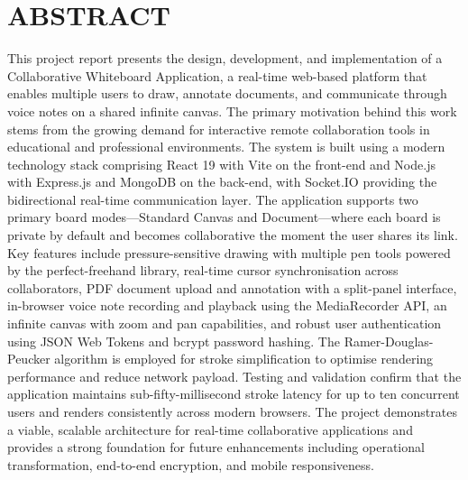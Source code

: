 \documentclass[12pt,a4paper]{report}
\begin{document}






\chapter*{ABSTRACT}

This project report presents the design, development, and implementation of a Collaborative Whiteboard Application, a real-time web-based platform that enables multiple users to draw, annotate documents, and communicate through voice notes on a shared infinite canvas. The primary motivation behind this work stems from the growing demand for interactive remote collaboration tools in educational and professional environments. The system is built using a modern technology stack comprising React 19 with Vite on the front-end and Node.js with Express.js and MongoDB on the back-end, with Socket.IO providing the bidirectional real-time communication layer. The application supports two primary board modes---Standard Canvas and Document---where each board is private by default and becomes collaborative the moment the user shares its link. Key features include pressure-sensitive drawing with multiple pen tools powered by the perfect-freehand library, real-time cursor synchronisation across collaborators, PDF document upload and annotation with a split-panel interface, in-browser voice note recording and playback using the MediaRecorder API, an infinite canvas with zoom and pan capabilities, and robust user authentication using JSON Web Tokens and bcrypt password hashing. The Ramer-Douglas-Peucker algorithm is employed for stroke simplification to optimise rendering performance and reduce network payload. Testing and validation confirm that the application maintains sub-fifty-millisecond stroke latency for up to ten concurrent users and renders consistently across modern browsers. The project demonstrates a viable, scalable architecture for real-time collaborative applications and provides a strong foundation for future enhancements including operational transformation, end-to-end encryption, and mobile responsiveness.

\tableofcontents
\end{document}
